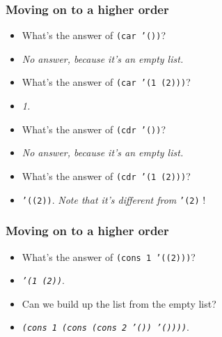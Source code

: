 \begin{frame}[fragile]
    \frametitle{Moving on to a higher order}
    \begin{itemize}
      \item What's the answer of \texttt{(car '())}?
      \item \emph{No answer, because it's an empty list.}
      \pause
      \item What's the answer of \texttt{(car '(1 (2)))}?
      \item \emph{1.}
      \pause
      \item What's the answer of \texttt{(cdr '())}?
      \item \emph{No answer, because it's an empty list.}
      \pause
      \item What's the answer of \texttt{(cdr '(1 (2)))}?
      \item \texttt{'((2))}. \emph{Note that it's different from } \texttt{'(2)} !
    \end{itemize}
\end{frame}

\begin{frame}[fragile]
  \frametitle{Moving on to a higher order}
  \begin{itemize}
    \item What's the answer of \texttt{(cons 1 '((2)))}?
    \item \emph{\texttt{'(1 (2))}}.
    \pause
    \item Can we build up the list from the empty list?
    \pause
    \item \emph{\texttt{(cons 1 (cons (cons 2 '()) '())))}}.
  \end{itemize}
\end{frame}

